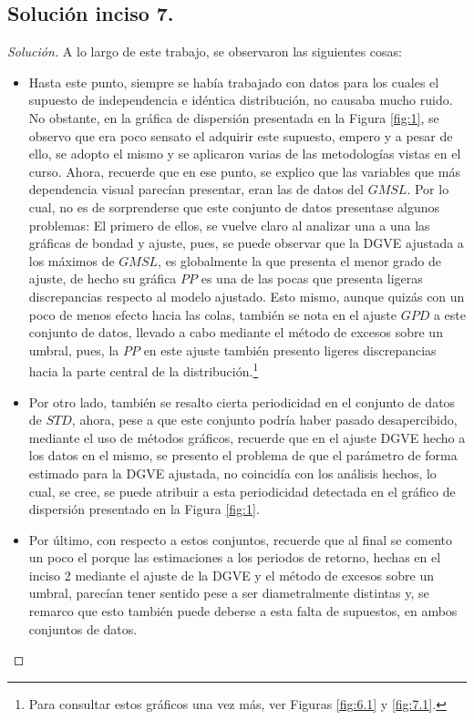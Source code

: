 \documentclass[10.5pt,notitlepage]{article}
\newenvironment{solucion}
  {\begin{proof}[Solución]}
  {\end{proof}}
\theoremstyle{plain}
\begin{document}
\subsection{Solución inciso 7.}
\begin{solucion}
A lo largo de este trabajo, se observaron las siguientes cosas: 
\begin{itemize}
    \item[1.] Hasta este punto, siempre se había trabajado con datos para los cuales el supuesto de independencia e idéntica distribución, no causaba mucho ruido. No obstante, en la gráfica de dispersión presentada en la Figura \ref{fig:1}, se observo que era poco sensato el adquirir este supuesto, empero y a pesar de ello, se adopto el mismo y se aplicaron varias de las metodologías vistas en el curso. Ahora, recuerde que en ese punto, se explico que las variables que más dependencia visual parecían presentar, eran las de datos del \(GMSL\). Por lo cual, no es de sorprenderse que este conjunto de datos presentase algunos problemas: El primero de ellos, se vuelve  claro al analizar una a una las gráficas de bondad y ajuste, pues, se puede observar que la DGVE ajustada a los máximos de \(GMSL\), es globalmente la que presenta el menor grado de ajuste, de hecho su gráfica \(PP\) es una de las pocas que presenta ligeras discrepancias respecto al modelo ajustado. Esto mismo, aunque quizás con un poco de menos efecto hacia las colas, también se nota en el ajuste \(GPD\) a este conjunto de datos, llevado a cabo mediante el método de excesos sobre un umbral, pues, la \(PP\) en este ajuste también presento ligeres discrepancias hacia la parte central de la distribución.\footnote{Para consultar estos gráficos una vez más, ver Figuras \ref{fig:6.1} y \ref{fig:7.1}.} 
    \item[2.] Por otro lado, también se resalto cierta periodicidad en el conjunto de datos de \(STD\), ahora, pese a que este conjunto podría haber pasado desapercibido, mediante el uso de métodos gráficos, recuerde que en el ajuste DGVE hecho a los datos en el mismo, se presento el problema de que el parámetro de forma estimado para la DGVE ajustada, no coincidía con los análisis hechos, lo cual, se cree, se puede atribuir a esta periodicidad detectada en el gráfico de dispersión presentado en la Figura \ref{fig:1}.
    \item[3.] Por último, con respecto a estos conjuntos, recuerde que al final se comento un poco el porque las estimaciones a los periodos de retorno, hechas en el inciso 2 mediante el ajuste de la DGVE y el método de excesos sobre un umbral, parecían tener sentido pese a ser diametralmente distintas y, se remarco que esto también puede deberse a esta falta de supuestos, en ambos conjuntos de datos. 

\end{itemize}
\end{solucion}
\end{document}
